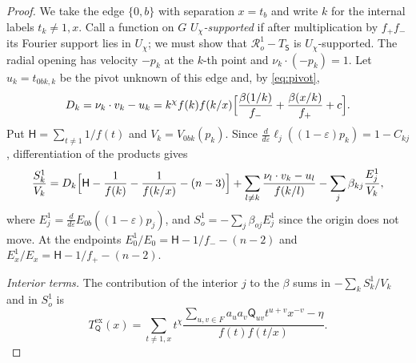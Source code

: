 \documentclass{amsart}
\theoremstyle{definition}
\theoremstyle{remark}
\numberwithin{equation}{section}
\begin{document}
\begin{proof}
We take the edge $\{0,b\}$ with separation $x=t_b$ and write $k$ for the internal
labels $t_k\ne1,x$. Call a function on $G$ \emph{$U_\chi$-supported} if after
multiplication by $f_+f_-$ its Fourier support lies in $U_\chi$; we must show that
$\mathcal R^1_o-T_{\mathsf S}$ is $U_\chi$-supported. The radial opening has velocity $-p_k$ at the
$k$-th point and $\nu_k\cdot(-p_k)=1$. Let $u_k=t_{0bk,k}$ be the pivot unknown of
this edge and, by \eqref{eq:pivot},
\begin{equation}\label{eq:Dk}
  D_k=\nu_k\cdot v_k-u_k=k^\chi f(k)f(k/x)\Bigl[\frac{\beta(1/k)}{f_-}
   +\frac{\beta(x/k)}{f_+}+c\Bigr].
\end{equation}
Put $\mathsf H=\sum_{t\ne1}1/f(t)$ and $V_k=V_{0bk}(p_k)$. Since
$\frac{d}{d\varepsilon}\ell_j((1-\varepsilon)p_k)=1-C_{kj}$, differentiation of the
products gives
\begin{equation}\label{eq:S1k}
  \frac{S^1_k}{V_k}=D_k\Bigl[\mathsf H-\frac1{f(k)}-\frac1{f(k/x)}-(n-3)\Bigr]
   +\sum_{l\ne k}\frac{\nu_l\cdot v_k-u_l}{f(k/l)}
   -\sum_j\beta_{kj}\frac{E^1_j}{V_k},
\end{equation}
where $E^1_j=\frac{d}{d\varepsilon}E_{0b}((1-\varepsilon)p_j)$, and
$S^1_o=-\sum_j\beta_{oj}E^1_j$ since the origin does not move. At the endpoints
$E^1_0/E_0=\mathsf H-1/f_--(n-2)$ and $E^1_x/E_x=\mathsf H-1/f_+-(n-2)$.

\emph{Interior terms.} The contribution of the interior $j$ to the $\beta$ sums in
$-\sum_kS^1_k/V_k$ and in $S^1_o$ is
\begin{equation}\label{eq:TQex}
  T^{\mathrm{ex}}_{\mathsf Q}(x)=\sum_{t\ne1,x}t^\chi
  \frac{\sum_{u,v\in F}a_ua_v\mathsf Q_{uv}t^{u+v}x^{-v}-\eta}{f(t)f(t/x)} .
\end{equation}


\end{proof}
\end{document}
